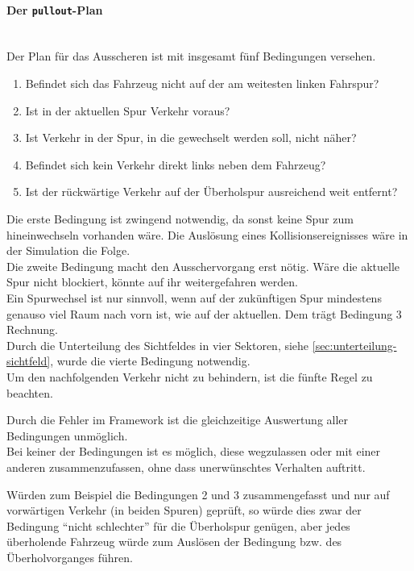 \paragraph*{Der \texttt{pullout}-Plan}
\hfill \\
Der Plan für das Ausscheren ist mit insgesamt fünf Bedingungen versehen.

\begin{enumerate}
	\itemsep0em
	\item Befindet sich das Fahrzeug nicht auf der am weitesten linken Fahrspur?
	\item Ist in der aktuellen Spur Verkehr voraus?
	\item Ist Verkehr in der Spur, in die gewechselt werden soll, nicht näher?
	\item Befindet sich kein Verkehr direkt links neben dem Fahrzeug?
	\item Ist der rückwärtige Verkehr auf der Überholspur ausreichend weit entfernt?
\end{enumerate}

Die erste Bedingung ist zwingend notwendig, da sonst keine Spur zum hineinwechseln vorhanden wäre.
Die Auslösung eines Kollisionsereignisses wäre in der Simulation die Folge.
\\
Die zweite Bedingung macht den Ausschervorgang erst nötig. 
Wäre die aktuelle Spur nicht blockiert, könnte auf ihr weitergefahren werden.
\\
Ein Spurwechsel ist nur sinnvoll, wenn auf der zukünftigen Spur mindestens genauso viel Raum nach vorn ist, wie auf der aktuellen. 
Dem trägt Bedingung 3 Rechnung.
\\
Durch die Unterteilung des Sichtfeldes in vier Sektoren, siehe \cref{sec:unterteilung-sichtfeld}, wurde die vierte Bedingung notwendig.
\\
Um den nachfolgenden Verkehr nicht zu behindern, ist die fünfte Regel zu beachten.

Durch die Fehler im Framework ist die gleichzeitige Auswertung aller Bedingungen unmöglich.
\\
Bei keiner der Bedingungen ist es möglich, diese wegzulassen oder mit einer anderen zusammenzufassen, ohne dass unerwünschtes Verhalten auftritt.

Würden zum Beispiel die Bedingungen 2 und 3 zusammengefasst und nur auf vorwärtigen Verkehr (in beiden Spuren) geprüft, so würde dies zwar der Bedingung \enquote{nicht schlechter} für die Überholspur genügen, aber jedes überholende Fahrzeug würde zum Auslösen der Bedingung bzw. des Überholvorganges führen.

